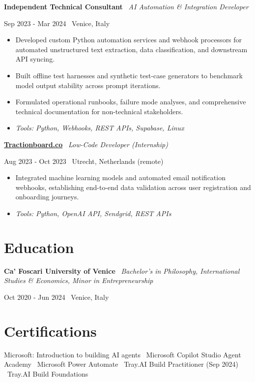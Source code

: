 \documentclass[a4paper,10pt]{article}
\newcommand{\role}[4]{%
 \vspace{2pt}\noindent
 \begin{minipage}[t]{0.70\textwidth}\raggedright\textbf{#1} \textbullet\ \textit{#3}\end{minipage}%
 \hfill
 \begin{minipage}[t]{0.28\textwidth}\raggedleft\footnotesize\color{gray}#2 \textbullet\ #4\end{minipage}%
 \vspace{1pt}%
}
\begin{document}
\role{Independent Technical Consultant}{Sep 2023 - Mar 2024}{AI Automation \& Integration Developer}{Venice, Italy}
\begin{itemize}
 \item Developed custom Python automation services and webhook processors for automated unstructured text extraction, data classification, and downstream API syncing.
 \item Built offline test harnesses and synthetic test-case generators to benchmark model output stability across prompt iterations.
 \item Formulated operational runbooks, failure mode analyses, and comprehensive technical documentation for non-technical stakeholders.
 \item \textit{Tools: Python, Webhooks, REST APIs, Supabase, Linux}
\end{itemize}

\role{\href{https://tractionboard.co}{Tractionboard.co}}{Aug 2023 - Oct 2023}{Low-Code Developer (Internship)}{Utrecht, Netherlands (remote)}
\begin{itemize}
 \item Integrated machine learning models and automated email notification webhooks, establishing end-to-end data validation across user registration and onboarding journeys.
 \item \textit{Tools: Python, OpenAI API, Sendgrid, REST APIs}
\end{itemize}

\section{Education}
\role{Ca' Foscari University of Venice}{Oct 2020 - Jun 2024}{Bachelor's in Philosophy, International Studies \& Economics, Minor in Entrepreneurship}{Venice, Italy}

\section{Certifications}
Microsoft: Introduction to building AI agents \textbullet\ Microsoft Copilot Studio Agent Academy \textbullet\ Microsoft Power Automate \textbullet\ Tray.AI Build Practitioner (Sep 2024) \textbullet\ Tray.AI Build Foundations

\end{document}
